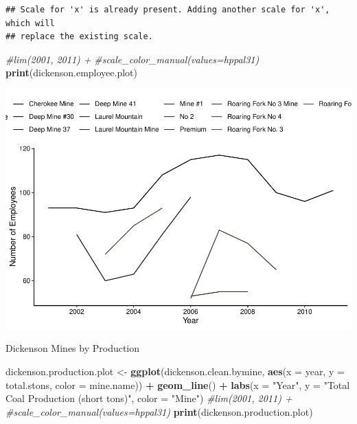 \documentclass[12pt,]{article}
\newenvironment{Shaded}{\begin{snugshade}}{\end{snugshade}}
\newcommand{\CommentTok}[1]{\textcolor[rgb]{0.56,0.35,0.01}{\textit{#1}}}
\newcommand{\DataTypeTok}[1]{\textcolor[rgb]{0.13,0.29,0.53}{#1}}
\newcommand{\KeywordTok}[1]{\textcolor[rgb]{0.13,0.29,0.53}{\textbf{#1}}}
\newcommand{\NormalTok}[1]{#1}
\newcommand{\OperatorTok}[1]{\textcolor[rgb]{0.81,0.36,0.00}{\textbf{#1}}}
\newcommand{\StringTok}[1]{\textcolor[rgb]{0.31,0.60,0.02}{#1}}
\begin{document}
\begin{verbatim}
## Scale for 'x' is already present. Adding another scale for 'x', which will
## replace the existing scale.
\end{verbatim}

\begin{Shaded}
\begin{Highlighting}[]
  \CommentTok{#lim(2001, 2011) +}
  \CommentTok{#scale_color_manual(values=hppal31)}
\KeywordTok{print}\NormalTok{(dickenson.employee.plot)}
\end{Highlighting}
\end{Shaded}

\includegraphics{Smith_ENV872_Project_files/figure-latex/unnamed-chunk-11-1.pdf}

Dickenson Mines by Production

\begin{Shaded}
\begin{Highlighting}[]
\NormalTok{dickenson.production.plot <-}\StringTok{ }\KeywordTok{ggplot}\NormalTok{(dickenson.clean.bymine, }\KeywordTok{aes}\NormalTok{(}\DataTypeTok{x =}\NormalTok{ year, }\DataTypeTok{y =}\NormalTok{ total.stons, }\DataTypeTok{color =}\NormalTok{ mine.name)) }\OperatorTok{+}
\StringTok{ }\KeywordTok{geom_line}\NormalTok{() }\OperatorTok{+}
\StringTok{  }\KeywordTok{labs}\NormalTok{(}\DataTypeTok{x =} \StringTok{"Year"}\NormalTok{, }\DataTypeTok{y =} \StringTok{"Total Coal Production (short tons)"}\NormalTok{, }\DataTypeTok{color =} \StringTok{"Mine"}\NormalTok{)}
  \CommentTok{#lim(2001, 2011) +}
  \CommentTok{#scale_color_manual(values=hppal31)}
\KeywordTok{print}\NormalTok{(dickenson.production.plot)}
\end{Highlighting}
\end{Shaded}
\end{document}
